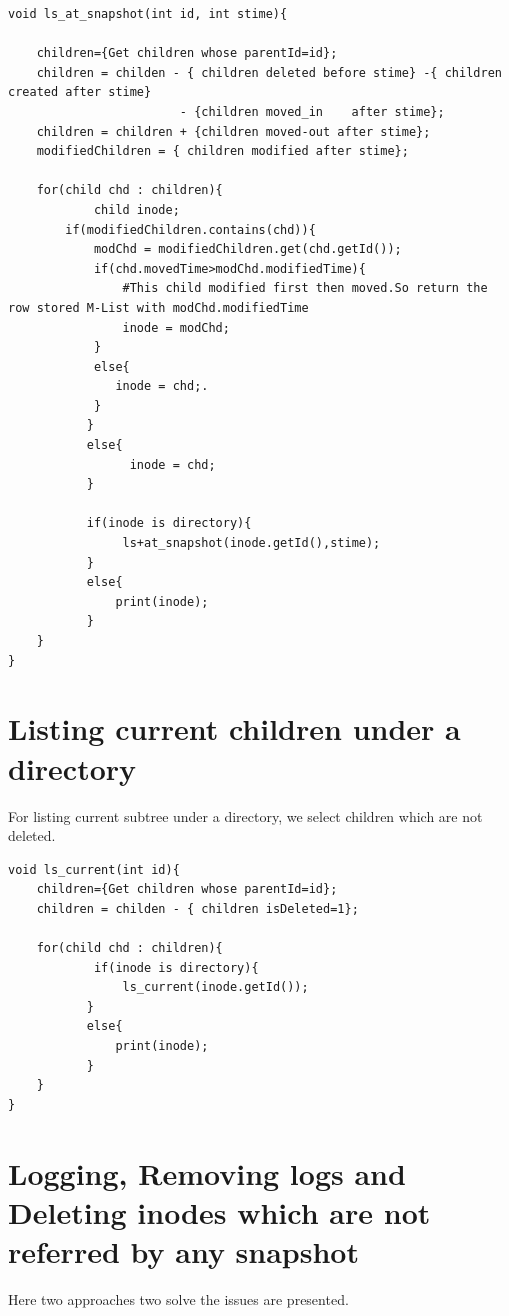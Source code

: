 \begin{verbatim}
void ls_at_snapshot(int id, int stime){

    children={Get children whose parentId=id};
    children = childen - { children deleted before stime} -{ children created after stime} 
                        - {children moved_in 	after stime};
    children = children + {children moved-out after stime};
    modifiedChildren = { children modified after stime};

    for(child chd : children){
    	    child inode;
        if(modifiedChildren.contains(chd)){
            modChd = modifiedChildren.get(chd.getId());
            if(chd.movedTime>modChd.modifiedTime){
                #This child modified first then moved.So return the row stored M-List with modChd.modifiedTime
                inode = modChd;             
            }
            else{
               inode = chd;.
            }
    	   }
    	   else{
    	         inode = chd;
    	   }
    	   
    	   if(inode is directory){
    	        ls+at_snapshot(inode.getId(),stime);
    	   }
    	   else{
    	       print(inode);
    	   }
    }
}

\end{verbatim}

\section{Listing current children under a directory }
For listing current subtree under a directory, we select children which are not deleted.\\
\begin{verbatim}
void ls_current(int id){
    children={Get children whose parentId=id};
    children = childen - { children isDeleted=1}; 

    for(child chd : children){
    	    if(inode is directory){
    	        ls_current(inode.getId());
    	   }
    	   else{
    	       print(inode);
    	   }
    }
}
\end{verbatim}

\section{Logging, Removing logs and Deleting inodes which are not referred by any snapshot}

Here two approaches two solve the issues are presented.
